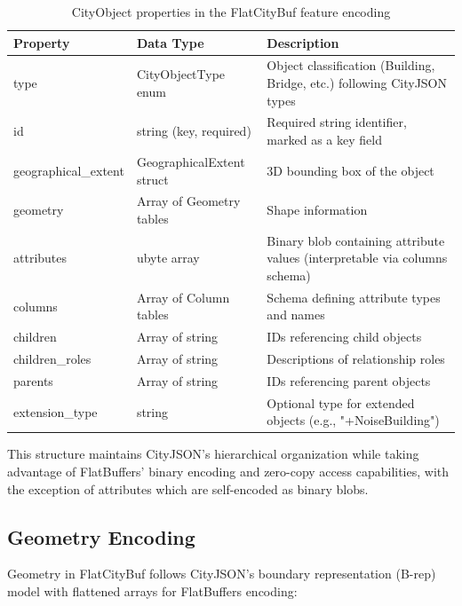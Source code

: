 \begin{itemize}
    \begin{table}[h]
      \centering
      \caption{CityObject properties in the FlatCityBuf feature encoding}
      \label{tab:cityobject_properties}
      \small
      \begin{tabularx}{\textwidth}{@{}llX@{}}
        \toprule
        \textbf{Property} & \textbf{Data Type} & \textbf{Description} \\
        \midrule
        type & CityObjectType enum & Object classification (Building, Bridge, etc.) following CityJSON types \\
        id & string (key, required) & Required string identifier, marked as a key field \\
        geographical\_extent & GeographicalExtent struct & 3D bounding box of the object \\
        geometry & Array of Geometry tables & Shape information \\
        attributes & ubyte array & Binary blob containing attribute values (interpretable via columns schema) \\
        columns & Array of Column tables & Schema defining attribute types and names \\
        children & Array of string & IDs referencing child objects \\
        children\_roles & Array of string & Descriptions of relationship roles \\
        parents & Array of string & IDs referencing parent objects \\
        extension\_type & string & Optional type for extended objects (e.g., "+NoiseBuilding") \\
        \bottomrule
      \end{tabularx}
    \end{table}
\end{itemize}

This structure maintains CityJSON's hierarchical organization while taking advantage of FlatBuffers' binary encoding and zero-copy access capabilities, with the exception of attributes which are self-encoded as binary blobs.

\subsection{Geometry Encoding}
\label{methodology:feature_encoding:geometry_encoding}

Geometry in FlatCityBuf follows CityJSON's boundary representation (B-rep) model with flattened arrays for FlatBuffers encoding:

